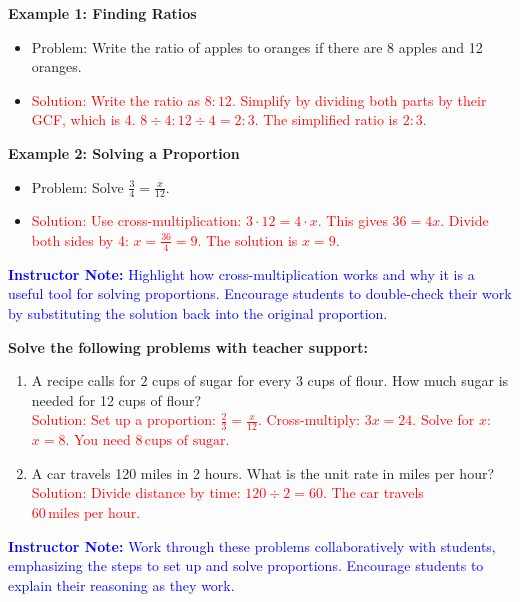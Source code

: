 \documentclass[12pt]{article}
\begin{document}
\begin{tcolorbox}[colframe=black!60, colback=white, 
coltitle=black, colbacktitle=black!15, fonttitle=\bfseries\Large, 
title=Examples, halign title=center, left=10pt, right=10pt, top=10pt, bottom=15pt]
\textbf{Example 1: Finding Ratios}
\begin{itemize}
    \item Problem: Write the ratio of apples to oranges if there are 8 apples and 12 oranges.
    \item \textcolor{red}{Solution: Write the ratio as \( 8:12 \). Simplify by dividing both parts by their GCF, which is 4. \( 8 \div 4 : 12 \div 4 = 2:3 \). The simplified ratio is \( 2:3 \).}
\end{itemize}

\textbf{Example 2: Solving a Proportion}
\begin{itemize}
    \item Problem: Solve \( \frac{3}{4} = \frac{x}{12} \).
    \item \textcolor{red}{Solution: Use cross-multiplication: \( 3 \cdot 12 = 4 \cdot x \). This gives \( 36 = 4x \). Divide both sides by 4: \( x = \frac{36}{4} = 9 \). The solution is \( x = 9 \).}
\end{itemize}

\textcolor{blue}{\textbf{Instructor Note:} Highlight how cross-multiplication works and why it is a useful tool for solving proportions. Encourage students to double-check their work by substituting the solution back into the original proportion.}
\end{tcolorbox}

\begin{tcolorbox}[colframe=black!60, colback=white, 
coltitle=black, colbacktitle=black!15, fonttitle=\bfseries\Large, 
title=Guided Practice, halign title=center, left=10pt, right=10pt, top=10pt, bottom=15pt]
\textbf{Solve the following problems with teacher support:}
\begin{enumerate}[itemsep=3em]
    \item A recipe calls for \( 2 \) cups of sugar for every \( 3 \) cups of flour. How much sugar is needed for 12 cups of flour?\\
    \textcolor{red}{Solution: Set up a proportion: \( \frac{2}{3} = \frac{x}{12} \). Cross-multiply: \( 3x = 24 \). Solve for \( x \): \( x = 8 \). You need \( 8 \, \text{cups of sugar} \).}
    
    \item A car travels 120 miles in 2 hours. What is the unit rate in miles per hour?\\
    \textcolor{red}{Solution: Divide distance by time: \( 120 \div 2 = 60 \). The car travels \( 60 \, \text{miles per hour} \).}
\end{enumerate}

\textcolor{blue}{\textbf{Instructor Note:} Work through these problems collaboratively with students, emphasizing the steps to set up and solve proportions. Encourage students to explain their reasoning as they work.}
\end{tcolorbox}
\end{document}
